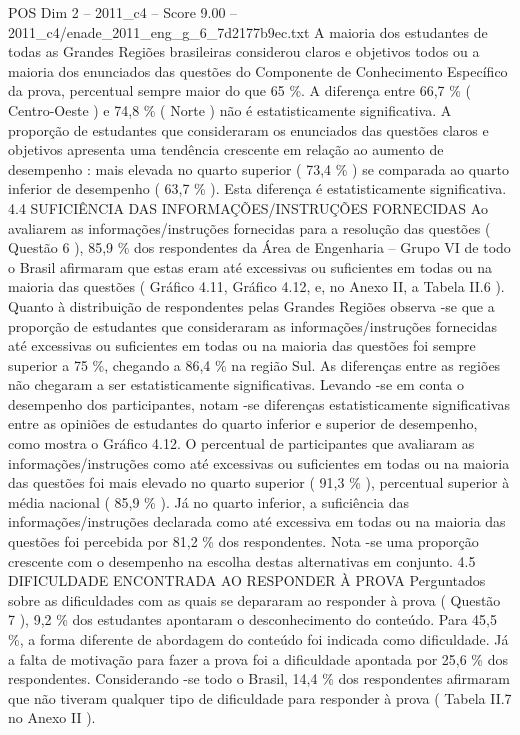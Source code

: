 \begin{textsample}{POS Dim 2 – 2011\_c4 – Score 9.00 – 2011\_c4/enade\_2011\_eng\_g\_6\_7d2177b9ec.txt}
A maioria dos estudantes de todas as Grandes Regiões brasileiras considerou claros e objetivos todos ou a maioria dos enunciados das questões do Componente de Conhecimento Específico da prova, percentual sempre maior do que 65 \%.
A diferença entre 66,7 \% ( Centro-Oeste ) e 74,8 \% ( Norte ) não é estatisticamente significativa.
A proporção de estudantes que consideraram os enunciados das questões claros e objetivos apresenta uma tendência crescente em relação ao aumento de desempenho : mais elevada no quarto superior ( 73,4 \% ) se comparada ao quarto inferior de desempenho ( 63,7 \% ).
Esta diferença é estatisticamente significativa. 4.4 SUFICIÊNCIA DAS INFORMAÇÕES/INSTRUÇÕES FORNECIDAS Ao avaliarem as informações/instruções fornecidas para a resolução das questões ( Questão 6 ), 85,9 \% dos respondentes da Área de Engenharia – Grupo VI de todo o Brasil afirmaram que estas eram até excessivas ou suficientes em todas ou na maioria das questões ( Gráfico 4.11, Gráfico 4.12, e, no Anexo II, a Tabela II.6 ).
Quanto à distribuição de respondentes pelas Grandes Regiões observa -se que a proporção de estudantes que consideraram as informações/instruções fornecidas até excessivas ou suficientes em todas ou na maioria das questões foi sempre superior a 75 \%, chegando a 86,4 \% na região Sul.
As diferenças entre as regiões não chegaram a ser estatisticamente significativas.
Levando -se em conta o desempenho dos participantes, notam -se diferenças estatisticamente significativas entre as opiniões de estudantes do quarto inferior e superior de desempenho, como mostra o Gráfico 4.12.
O percentual de participantes que avaliaram as informações/instruções como até excessivas ou suficientes em todas ou na maioria das questões foi mais elevado no quarto superior ( 91,3 \% ), percentual superior à média nacional ( 85,9 \% ).
Já no quarto inferior, a suficiência das informações/instruções declarada como até excessiva em todas ou na maioria das questões foi percebida por 81,2 \% dos respondentes.
Nota -se uma proporção crescente com o desempenho na escolha destas alternativas em conjunto. 4.5 DIFICULDADE ENCONTRADA AO RESPONDER À PROVA Perguntados sobre as dificuldades com as quais se depararam ao responder à prova ( Questão 7 ), 9,2 \% dos estudantes apontaram o desconhecimento do conteúdo.
Para 45,5 \%, a forma diferente de abordagem do conteúdo foi indicada como dificuldade.
Já a falta de motivação para fazer a prova foi a dificuldade apontada por 25,6 \% dos respondentes.
Considerando -se todo o Brasil, 14,4 \% dos respondentes afirmaram que não tiveram qualquer tipo de dificuldade para responder à prova ( Tabela II.7 no Anexo II ).

\end{textsample}
